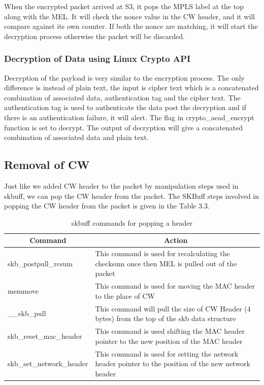 When the encrypted packet arrived at S3, it pops the MPLS label at the top along with the MEL. It will check the nonce value in the CW header, and it will compare against its own counter. If both the nonce are matching, it will start the decryption process otherwise the packet will be discarded.\\

\subsubsection{Decryption of Data using Linux Crypto API}

Decryption of the payload is very similar to the encryption process. The only difference is instead of plain text, the input is cipher text which is a concatenated combination of associated data, authentication tag and the cipher text. The authentication tag is used to authenticate the data post the decryption and if there is an authentication failure, it will alert. The flag in crypto_aead_encrypt function is set to decrypt. The output of decryption will give a concatenated combination of associated data and plain text.\\

 

\subsection{Removal of CW}

Just like we added CW header to the packet by manipulation steps used in skbuff, we can pop the CW header from the packet. The SKBuff steps involved in popping the CW header from the packet is given in the Table 3.3.\\


\begin{table}[ht]
  \centering
  \caption{skbuff commands for popping a header}
    \begin{tabular}{|l|p{22.5em}|}
    \toprule
    \hline
    \multicolumn{1}{|c|}{Command} & \multicolumn{1}{c|}{Action} \\
    \hline
    \midrule
    skb\_postpull\_rcsum & This command is used for recalculating the checksum once then MEL is pulled out of the packet \\
    \hline
    \midrule
    memmove & This command is used for moving the MAC header to the place of CW \\
    \hline
    \midrule
    \_\_skb\_pull & This command will pull the size of CW Header (4 bytes) from the top of the skb data structure \\
    \hline
    \midrule
    skb\_reset\_mac\_header & This command is used shifting the MAC header pointer to the new position of the MAC header \\
    \hline
    \midrule
    skb\_set\_network\_header & This command is used for setting the network header pointer to the position of the new network header \\
    \hline
    \bottomrule
    \end{tabular}%
  \label{tab:addlabel}%
\end{table}%





